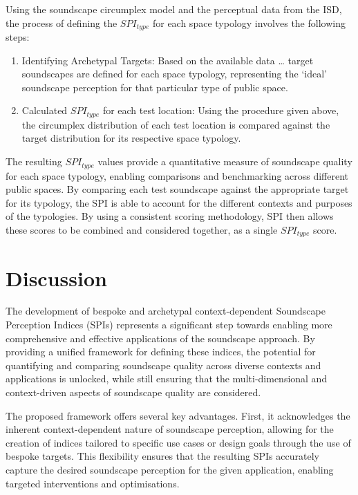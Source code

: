 \documentclass[
  authoryear,
  preprint,
  3p]{elsarticle}
\providecommand{\tightlist}{%
  \setlength{\itemsep}{0pt}\setlength{\parskip}{0pt}}\usepackage{longtable,booktabs,array}
\begin{document}
Using the soundscape circumplex model and the perceptual data from the
ISD, the process of defining the \(SPI_{type}\) for each space typology
involves the following steps:

\begin{enumerate}
\def\labelenumi{\arabic{enumi}.}
\tightlist
\item
  Identifying Archetypal Targets: Based on the available data \ldots{}
  target soundscapes are defined for each space typology, representing
  the `ideal' soundscape perception for that particular type of public
  space.
\item
  Calculated \(SPI_{type}\) for each test location: Using the procedure
  given above, the circumplex distribution of each test location is
  compared against the target distribution for its respective space
  typology.
\end{enumerate}

The resulting \(SPI_{type}\) values provide a quantitative measure of
soundscape quality for each space typology, enabling comparisons and
benchmarking across different public spaces. By comparing each test
soundscape against the appropriate target for its typology, the SPI is
able to account for the different contexts and purposes of the
typologies. By using a consistent scoring methodology, SPI then allows
these scores to be combined and considered together, as a single
\(SPI_{type}\) score.

\section{Discussion}\label{discussion}

The development of bespoke and archetypal context-dependent Soundscape
Perception Indices (SPIs) represents a significant step towards enabling
more comprehensive and effective applications of the soundscape
approach. By providing a unified framework for defining these indices,
the potential for quantifying and comparing soundscape quality across
diverse contexts and applications is unlocked, while still ensuring that
the multi-dimensional and context-driven aspects of soundscape quality
are considered.

The proposed framework offers several key advantages. First, it
acknowledges the inherent context-dependent nature of soundscape
perception, allowing for the creation of indices tailored to specific
use cases or design goals through the use of bespoke targets. This
flexibility ensures that the resulting SPIs accurately capture the
desired soundscape perception for the given application, enabling
targeted interventions and optimisations.
\end{document}
